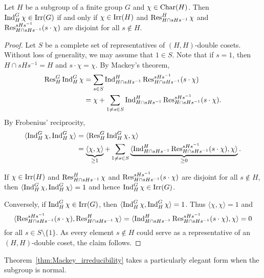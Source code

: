 \begin{theorem}
\label{thm:Mackey_irreducibility}
Let $H$ be a subgroup of a finite group $G$ and $\chi\in\operatorname{Char}(H)$.
Then $\operatorname{Ind}_H^G\chi\in\operatorname{Irr}(G)$ if and only if $\chi\in\operatorname{Irr}(H)$ and $\operatorname{Res}_{H\cap sHs^{-1}}^H\chi$ and 
$\operatorname{Res}_{H\cap sHs^{-1}}^{sHs^{-1}}(s\cdot\chi)$ are disjoint for all $s\not\in H$. 
\end{theorem}
\begin{proof}
    Let $S$ be a complete set of representatives of $(H,H)$-double cosets. Without loss of generality, 
    we may assume that $1\in S$. Note that if $s=1$, then 
    $H\cap sHs^{-1}=H$ and $s\cdot\chi=\chi$. By Mackey's theorem, 
    \begin{align*}
        \operatorname{Res}_H^G\operatorname{Ind}_H^G\chi 
        &=\sum_{s\in S}\operatorname{Ind}_{H\cap sHs^{-1}}^H\operatorname{Res}_{H\cap sHs^{-1}}^{sHs^{-1}}(s\cdot\chi)\\
        &=\chi+\sum_{1\ne s\in S}\operatorname{Ind}_{H\cap sHs^{-1}}^H\operatorname{Res}_{H\cap sHs^{-1}}^{sHs^{-1}}(s\cdot\chi).
    \end{align*}
    By Frobenius' reciprocity, 
    \begin{align*}
        \langle\operatorname{Ind}_H^G\chi,\operatorname{Ind}_H^G\chi\rangle
        &=\langle\operatorname{Res}_H^G\operatorname{Ind}_H^G\chi,\chi\rangle\\
        &=\underbrace{\langle\chi,\chi\rangle}_{\geq1}+\sum_{1\ne s\in S}\underbrace{\langle\operatorname{Ind}_{H\cap sHs^{-1}}^H\operatorname{Res}_{H\cap sHs^{-1}}^{sHs^{-1}}(s\cdot\chi),\chi\rangle}_{\geq0}.
    \end{align*}

    If $\chi\in\operatorname{Irr}(H)$ and $\operatorname{Res}_{H\cap sHs^{-1}}^H\chi$ and 
    $\operatorname{Res}_{H\cap sHs^{-1}}^{sHs^{-1}}(s\cdot\chi)$ are disjoint for all $s\not\in H$, then 
    $\langle\operatorname{Ind}_H^G\chi,\operatorname{Ind}_H^G\chi\rangle=1$ and hence $\operatorname{Ind}_H^G\chi\in\operatorname{Irr}(G)$. 

    Conversely, if $\operatorname{Ind}_H^G\chi\in\operatorname{Irr}(G)$, then $\langle\operatorname{Ind}_H^G\chi,\operatorname{Ind}_H^G\chi\rangle=1$. Thus 
    $\langle\chi,\chi\rangle=1$ and 
    \[
    \langle\operatorname{Res}_{H\cap sHs^{-1}}^{sHs^{-1}}(s\cdot\chi),\operatorname{Res}_{H\cap sHs^{-1}}^H\chi\rangle=
    \langle\operatorname{Ind}_{H\cap sHs^{-1}}^H\operatorname{Res}_{H\cap sHs^{-1}}^{sHs^{-1}}(s\cdot\chi),\chi\rangle=0
    \]
    for all $s\in S\setminus\{1\}$. As every element $s\notin H$ 
    could serve as a representative of an $(H,H)$-double coset, the claim follows.
\end{proof}

Theorem~\ref{thm:Mackey_irreducibility} takes a particularly elegant form when the subgroup is normal.

